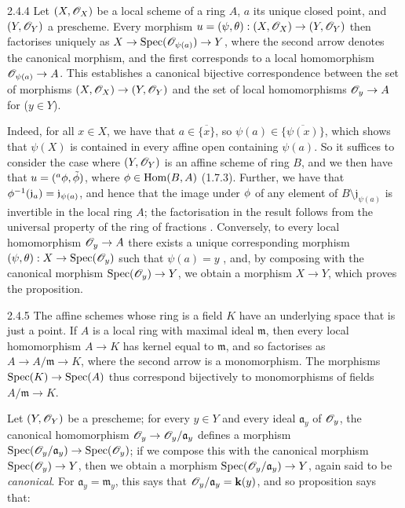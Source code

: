 \documentclass[10pt,oneside]{book}
\begin{document}
\begin{envs}[Proposition]{2.4.4}
\label{prop-1.2.4.4}
Let $(X,\mathscr{O}_X)$ be a local scheme of a ring
$A$, $a$ its unique closed point, and $(Y,\mathscr{O}_Y)$ a prescheme.  Every morphism
$u=(\psi,\theta):(X,\mathscr{O}_X)\to(Y,\mathscr{O}_Y)$ then factorises uniquely as
$X\to{\mathop{\mathrm{Spec}}\nolimits}(\mathscr{O}_{\psi(a)})\to Y$, where the second arrow denotes the canonical
morphism, and the first corresponds to a local homomorphism $\mathscr{O}_{\psi(a)}\to A$.
This establishes a canonical bijective correspondence between the set of
morphisms $(X,\mathscr{O}_X)\to(Y,\mathscr{O}_Y)$ and the set of local homomorphisms $\mathscr{O}_y\to A$
for ($y\in Y$).
\end{envs}
    
Indeed, for all $x\in X$, we have that $a\in\overline{\{x\}}$, so
$\psi(a)\in\overline{\{\psi(x)\}}$, which shows that $\psi(X)$ is contained in
every affine open containing $\psi(a)$. So it suffices to consider the case
where $(Y,\mathscr{O}_Y)$ is an affine scheme of ring $B$, and we then have that
$u=(^a\phi,\tilde{\phi})$, where $\phi\in{\mathop{\mathrm{Hom}}\nolimits}(B,A)$ (1.7.3).  Further,
we have that $\phi^{-1}(\mathfrak{j}_a)=\mathfrak{j}_{\psi(a)}$, and hence
that the image under $\phi$ of any element of
$B\setminus\mathfrak{j}_{\psi(a)}$ is invertible in the local ring $A$; the
factorisation in the result follows from the universal property of the ring of
fractions . Conversely, to every local homomorphism
$\mathscr{O}_y\to A$ there exists a unique corresponding morphism
$(\psi,\theta):X\to{\mathop{\mathrm{Spec}}\nolimits}(\mathscr{O}_y)$ such that $\psi(a)=y$ , and,
by composing with the canonical morphism ${\mathop{\mathrm{Spec}}\nolimits}(\mathscr{O}_y)\to Y$, we obtain a morphism
$X\to Y$, which proves the proposition.
    
\begin{env}{2.4.5}
\label{env-1.2.4.5}
The affine schemes whose ring is a field $K$ have an
underlying space that is just a point. If $A$ is a local ring with maximal
ideal $\mathfrak{m}$, then every local homomorphism $A\to K$ has kernel equal to
$\mathfrak{m}$, and so factorises as $A\to A/\mathfrak{m}\to K$, where the
second arrow is a monomorphism. The morphisms ${\mathop{\mathrm{Spec}}\nolimits}(K)\to{\mathop{\mathrm{Spec}}\nolimits}(A)$ thus
correspond bijectively to monomorphisms of fields $A/\mathfrak{m}\to K$.
\end{env}
    
Let $(Y,\mathscr{O}_Y)$ be a prescheme; for every $y\in Y$ and every ideal
$\mathfrak{a}_y$ of $\mathscr{O}_y$, the canonical homomorphism
$\mathscr{O}_y\to\mathscr{O}_y/\mathfrak{a}_y$ defines a morphism
${\mathop{\mathrm{Spec}}\nolimits}(\mathscr{O}_y/\mathfrak{a}_y)\to{\mathop{\mathrm{Spec}}\nolimits}(\mathscr{O}_y)$; if we compose this with the
canonical morphism ${\mathop{\mathrm{Spec}}\nolimits}(\mathscr{O}_y)\to Y$, then we obtain a morphism
${\mathop{\mathrm{Spec}}\nolimits}(\mathscr{O}_y/\mathfrak{a}_y)\to Y$, again said to be \textit{canonical}. For
$\mathfrak{a}_y=\mathfrak{m}_y$, this says that $\mathscr{O}_y/\mathfrak{a}_y=\mathbf{k}(y)$, and
so proposition  says that:
    
\end{document}
